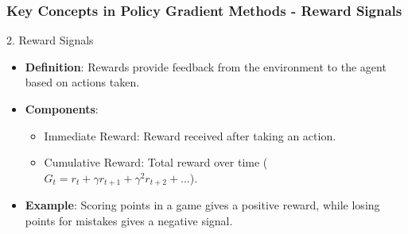 \documentclass[aspectratio=169]{beamer}
\begin{document}
\begin{frame}[fragile]
    \frametitle{Key Concepts in Policy Gradient Methods - Reward Signals}
    \begin{block}{2. Reward Signals}
        \begin{itemize}
            \item \textbf{Definition}: Rewards provide feedback from the environment to the agent based on actions taken.
            \item \textbf{Components}:
                \begin{itemize}
                    \item Immediate Reward: Reward received after taking an action.
                    \item Cumulative Reward: Total reward over time (\( G_t = r_t + \gamma r_{t+1} + \gamma^2 r_{t+2} + \ldots \)).
                \end{itemize}
            \item \textbf{Example}: Scoring points in a game gives a positive reward, while losing points for mistakes gives a negative signal.
        \end{itemize}
    \end{block}
\end{frame}
\end{document}
